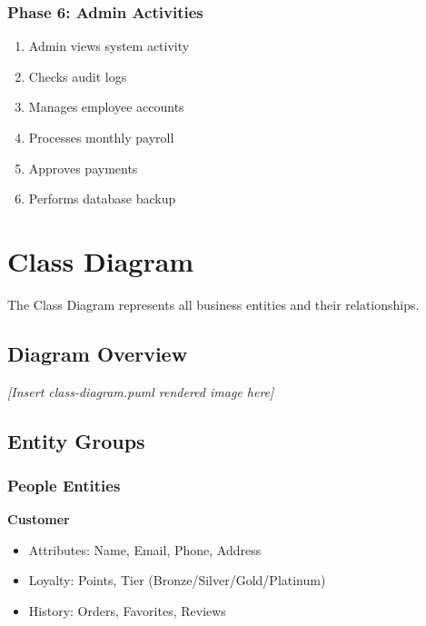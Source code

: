 \documentclass[12pt,a4paper]{article}
\begin{document}
\subsubsection{Phase 6: Admin Activities}
\begin{enumerate}
    \item Admin views system activity
    \item Checks audit logs
    \item Manages employee accounts
    \item Processes monthly payroll
    \item Approves payments
    \item Performs database backup
\end{enumerate}

\section{Class Diagram}

The Class Diagram represents all business entities and their relationships.

\subsection{Diagram Overview}

\begin{center}
\textit{[Insert class-diagram.puml rendered image here]}
\end{center}

\subsection{Entity Groups}

\subsubsection{People Entities}

\textbf{Customer}
\begin{itemize}
    \item Attributes: Name, Email, Phone, Address
    \item Loyalty: Points, Tier (Bronze/Silver/Gold/Platinum)
    \item History: Orders, Favorites, Reviews
\end{itemize}
\end{document}
